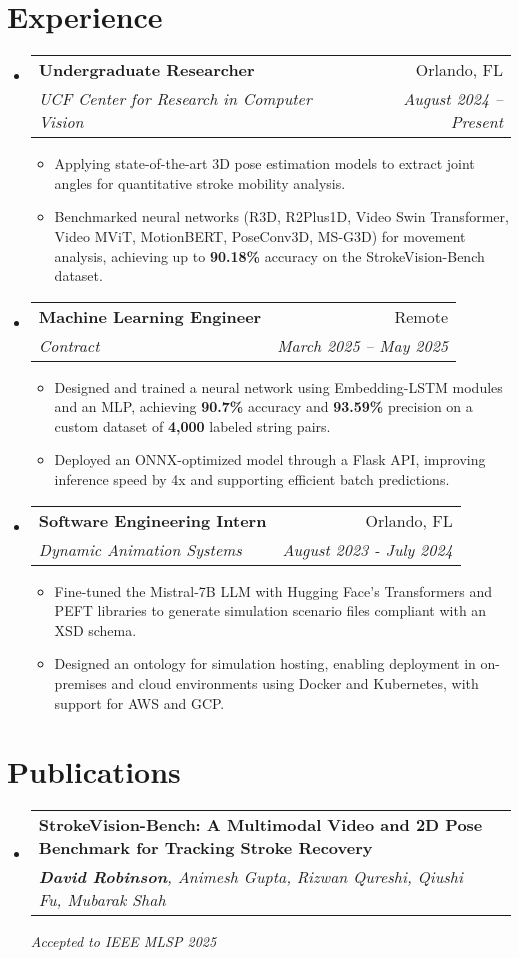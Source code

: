 \documentclass[letterpaper,11pt]{article}
\makeatletter
\newcommand{\resumeItem}[1]{
  \item\small{
    {#1 \vspace{-2pt}}
  }
}
\newcommand{\resumeSubheading}[4]{
  \vspace{-2pt}\item
    \begin{tabular*}{0.97\textwidth}[t]{l@{\extracolsep{\fill}}r}
      \textbf{#1} & #2 \\
      \textit{\small#3} & \textit{\small #4} \\
    \end{tabular*}\vspace{-7pt}
}
\newcommand{\resumeSubHeadingListStart}{\begin{itemize}[leftmargin=0.15in, label={}]}
\newcommand{\resumeSubHeadingListEnd}{\end{itemize}}
\newcommand{\resumeItemListStart}{\begin{itemize}}
\newcommand{\resumeItemListEnd}{\end{itemize}\vspace{-5pt}}
\makeatother
\begin{document}
\section{Experience}
  \resumeSubHeadingListStart
  \resumeSubheading
    {Undergraduate Researcher}{Orlando, FL}
    {UCF Center for Research in Computer Vision}{August 2024 -- Present}
    \resumeItemListStart
      \resumeItem{Applying state-of-the-art 3D pose estimation models to extract joint angles for quantitative stroke mobility analysis.}
      \resumeItem{Benchmarked neural networks (R3D, R2Plus1D, Video Swin Transformer, Video MViT, MotionBERT, PoseConv3D, MS-G3D) for movement analysis, achieving up to \textbf{90.18\%} accuracy on the StrokeVision-Bench dataset.}
    \resumeItemListEnd
    \resumeSubheading
      {Machine Learning Engineer}{Remote}
      {Contract}{March 2025 -- May 2025}
      \resumeItemListStart
        \resumeItem{Designed and trained a neural network using Embedding-LSTM modules and an MLP, achieving \textbf{90.7\%} accuracy and \textbf{93.59\%} precision on a custom dataset of \textbf{4,000} labeled string pairs.}
        \resumeItem{Deployed an ONNX-optimized model through a Flask API, improving inference speed by 4x and supporting efficient batch predictions.}
      \resumeItemListEnd
    \resumeSubheading
      {Software Engineering Intern}{Orlando, FL}
      {Dynamic Animation Systems}{August 2023 - July 2024}
      \resumeItemListStart
        \resumeItem{Fine-tuned the Mistral-7B LLM with Hugging Face's Transformers and PEFT libraries to generate simulation scenario files compliant with an XSD schema.}
        \resumeItem{Designed an ontology for simulation hosting, enabling deployment in on-premises and cloud environments using Docker and Kubernetes, with support for AWS and GCP.}
      \resumeItemListEnd
  \resumeSubHeadingListEnd
  
  \section{Publications}
  \resumeSubHeadingListStart
    \resumeSubheading
      {StrokeVision-Bench: A Multimodal Video and 2D Pose Benchmark for Tracking Stroke Recovery}{} 
      {\textbf{David Robinson}, Animesh Gupta, Rizwan Qureshi, Qiushi Fu, Mubarak Shah}{}
      \vspace{0em}

      \textit{Accepted to IEEE MLSP 2025}
  \resumeSubHeadingListEnd
\end{document}
